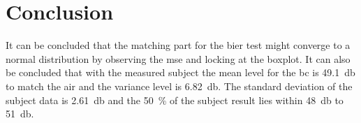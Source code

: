 \section{Conclusion}
It can be concluded that the matching part for the \gls{bier} test might converge to a normal distribution by observing the \gls{mse} and locking at the boxplot. It can also be concluded that with the measured subject the mean level for the \gls{bc} is \SI{49.1}{\decibel} to match the air and the variance level is \SI{6.82}{\decibel}. The standard deviation of the subject data is \SI{2.61}{\decibel} and the \SI{50}{\percent} of the subject result lies within \SI{48}{\decibel} to \SI{51}{\decibel}.





